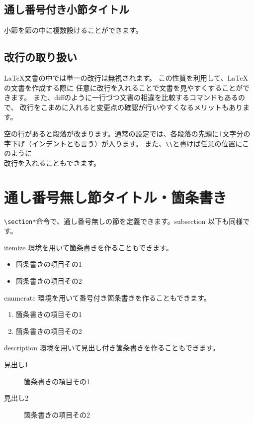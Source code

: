 \documentclass[platex,a4paper,12pt,dvipdfmx]{jsarticle}
\begin{document}
\subsection{通し番号付き小節タイトル}
小節を節の中に複数設けることができます。

\subsection{改行の取り扱い}
\LaTeX 文書の中では単一の改行は無視されます。
この性質を利用して、\LaTeX の文書を作成する際に
任意に改行を入れることで文書を見やすくすることができます。
また、diffのように一行づつ文書の相違を比較するコマンドもあるので、
改行をこまめに入れると変更点の確認が行いやすくなるメリットもあります。

空の行があると段落が改まります。通常の設定では、各段落の先頭に1文字分の字下げ（インデントとも言う）が入ります。
また、\verb+\\+と書けば任意の位置にこのように \\ 改行を入れることもできます。

\section*{通し番号無し節タイトル・箇条書き}
\verb+\section*+命令で、通し番号無しの節を定義できます。subsection 以下も同様です。

itemize 環境を用いて箇条書きを作ることもできます。
\begin{itemize}
\item 箇条書きの項目その1
\item 箇条書きの項目その2
\end{itemize}

enumerate 環境を用いて番号付き箇条書きを作ることもできます。
\begin{enumerate}
\item 箇条書きの項目その1
\item 箇条書きの項目その2
\end{enumerate}

description 環境を用いて見出し付き箇条書きを作ることもできます。
\begin{description}
\item[見出し1] 箇条書きの項目その1
\item[見出し2] 箇条書きの項目その2
\end{description}
\end{document}
